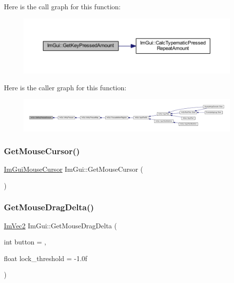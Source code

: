 Here is the call graph for this function\+:
\nopagebreak
\begin{figure}[H]
\begin{center}
\leavevmode
\includegraphics[width=350pt]{namespace_im_gui_ad94a09fc01052f02fe11bec5a3c11275_cgraph}
\end{center}
\end{figure}
Here is the caller graph for this function\+:
\nopagebreak
\begin{figure}[H]
\begin{center}
\leavevmode
\includegraphics[width=350pt]{namespace_im_gui_ad94a09fc01052f02fe11bec5a3c11275_icgraph}
\end{center}
\end{figure}
\mbox{\label{namespace_im_gui_a3b955bb840a2411f7c19ac6687d57392}} 
\subsubsection{\texorpdfstring{Get\+Mouse\+Cursor()}{GetMouseCursor()}}
{\footnotesize\ttfamily \mbox{\hyperlink{imgui_8h_a9223d6c82bb5d12c2eab5f829ca520ef}{Im\+Gui\+Mouse\+Cursor}} Im\+Gui\+::\+Get\+Mouse\+Cursor (\begin{DoxyParamCaption}{ }\end{DoxyParamCaption})}

\mbox{\label{namespace_im_gui_a94b8aecab8a4128145fea1ad7d381197}} 
\subsubsection{\texorpdfstring{Get\+Mouse\+Drag\+Delta()}{GetMouseDragDelta()}}
{\footnotesize\ttfamily \mbox{\hyperlink{struct_im_vec2}{Im\+Vec2}} Im\+Gui\+::\+Get\+Mouse\+Drag\+Delta (\begin{DoxyParamCaption}\item[{int}]{button = {},  }\item[{float}]{lock\+\_\+threshold = {\ttfamily -\/1.0f} }\end{DoxyParamCaption})}

